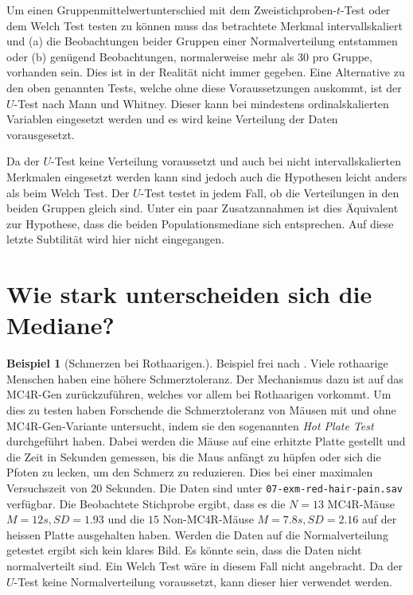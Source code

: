 \documentclass[
]{book}
\theoremstyle{definition}
\theoremstyle{definition}
\newtheorem{example}{Beispiel}[chapter]
\theoremstyle{definition}
\theoremstyle{definition}
\theoremstyle{remark}
\begin{document}
Um einen Gruppenmittelwertunterschied mit dem Zweistichproben-\(t\)-Test oder dem Welch Test testen zu können muss das betrachtete Merkmal intervallskaliert und (a) die Beobachtungen beider Gruppen einer Normalverteilung entstammen oder (b) genügend Beobachtungen, normalerweise mehr als \(30\) pro Gruppe, vorhanden sein. Dies ist in der Realität nicht immer gegeben. Eine Alternative zu den oben genannten Tests, welche ohne diese Voraussetzungen auskommt, ist der \(U\)-Test nach Mann und Whitney. Dieser kann bei mindestens ordinalskalierten Variablen eingesetzt werden und es wird keine Verteilung der Daten vorausgesetzt.

Da der \(U\)-Test keine Verteilung voraussetzt und auch bei nicht intervallskalierten Merkmalen eingesetzt werden kann sind jedoch auch die Hypothesen leicht anders als beim Welch Test. Der \(U\)-Test testet in jedem Fall, ob die Verteilungen in den beiden Gruppen gleich sind. Unter ein paar Zusatzannahmen ist dies Äquivalent zur Hypothese, dass die beiden Populationsmediane sich entsprechen. Auf diese letzte Subtilität wird hier nicht eingegangen.

\section{Wie stark unterscheiden sich die Mediane?}\label{wie-stark-unterscheiden-sich-die-mediane}

\begin{example}[Schmerzen bei Rothaarigen.]
\protect\hypertarget{exm:red-hair-pain}{}\label{exm:red-hair-pain}Beispiel frei nach \citet{robinson2021}. Viele rothaarige Menschen haben eine höhere Schmerztoleranz. Der Mechanismus dazu ist auf das MC4R-Gen zurückzuführen, welches vor allem bei Rothaarigen vorkommt. Um dies zu testen haben Forschende die Schmerztoleranz von Mäusen mit und ohne MC4R-Gen-Variante untersucht, indem sie den sogenannten \emph{Hot Plate Test} durchgeführt haben. Dabei werden die Mäuse auf eine erhitzte Platte gestellt und die Zeit in Sekunden gemessen, bis die Maus anfängt zu hüpfen oder sich die Pfoten zu lecken, um den Schmerz zu reduzieren. Dies bei einer maximalen Versuchszeit von \(20\) Sekunden. Die Daten sind unter \texttt{07-exm-red-hair-pain.sav} verfügbar. Die Beobachtete Stichprobe ergibt, dass es die \(N = 13\) MC4R-Mäuse \(M = 12s, SD = 1.93\) und die \(15\) Non-MC4R-Mäuse \(M = 7.8s, SD = 2.16\) auf der heissen Platte ausgehalten haben. Werden die Daten auf die Normalverteilung getestet ergibt sich kein klares Bild. Es könnte sein, dass die Daten nicht normalverteilt sind. Ein Welch Test wäre in diesem Fall nicht angebracht. Da der \(U\)-Test keine Normalverteilung voraussetzt, kann dieser hier verwendet werden.
\end{example}
\end{document}
